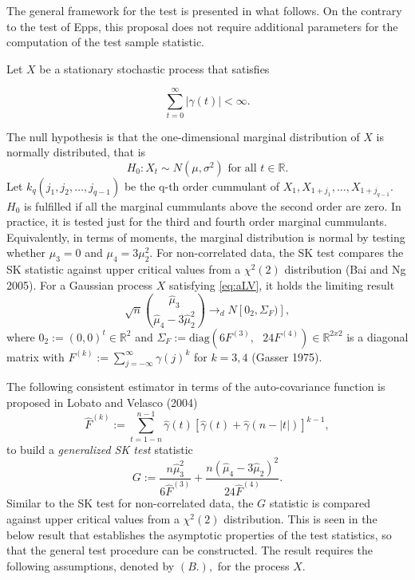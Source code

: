 The general framework for the test is presented in what follows. On the contrary to the test of Epps, this proposal does not require additional parameters for the computation of the test sample statistic.

Let \(X\) be a stationary stochastic process that satisfies

\begin{equation}
 \sum_{t=0}^{\infty}|\gamma(t)| <\infty. \label{eq:aLV}
\end{equation}

The null hypothesis is that the one-dimensional marginal distribution of \(X\) is normally distributed, that is
\[
H_0: X_t \sim N(\mu,\sigma^2) \text{ for all } t \in \mathbb{R}.
\]
Let \(k_q(j_1,j_2,\ldots,j_{q-1})\) be the q-th order cummulant of \(X_{1},X_{1+j_1},\ldots,X_{1+j_{q-1}}\). \(H_0\) is fulfilled if all the marginal cummulants above the second order are zero. In practice, it is tested just for the third and fourth order marginal cummulants. Equivalently, in terms of moments, the marginal distribution is normal by testing whether \(\mu_3 = 0\) and \(\mu_4 = 3 \mu_2^2\). For non-correlated data, the SK test compares the SK statistic against upper critical values from a \(\chi^2(2)\) distribution (Bai and Ng 2005). For a Gaussian process \(X\) satisfying \eqref{eq:aLV}, it holds the limiting result
\[
 \sqrt{n} \binom{\widehat{\mu}_3}{\widehat{\mu}_4 -3\widehat{\mu}^2_2} \to_d N[0_2,\Sigma_F)],
\]
where \(0_2 := (0,0)^t \in \mathbb{R}^2\) and \(\Sigma_F := \mbox{diag}(6F^{(3)}, \text{ } 24F^{(4)}) \in \mathbb{R}^{2x2}\) is a diagonal matrix with \(F^{(k)} := \sum_{j = -\infty}^{\infty}\gamma(j)^k\) for \(k=3,4\) (Gasser 1975).

The following consistent estimator in terms of the auto-covariance function is proposed in Lobato and Velasco (2004)
\[
 \widehat{F}^{(k)} := \sum_{t = 1-n}^{n-1}\widehat{\gamma}(t)[\widehat{\gamma}(t) +\widehat{\gamma}(n-|t|)]^{k-1},
\]
to build a \emph{generalized SK test} statistic
\[
 G := \dfrac{n \widehat{\mu}_3^2}{6 \widehat{F}^{(3)}} + \dfrac{n(\widehat{\mu}_4 -3\widehat{\mu}_2)^2}{24\widehat{F}^{(4)}}.
\]
Similar to the SK test for non-correlated data, the \(G\) statistic is compared against upper critical values from a \(\chi^2(2)\) distribution. This is seen in the below result that establishes the asymptotic properties of the test statistics, so that the general test procedure can be constructed. The result requires the following assumptions, denoted by \((B.),\) for the process \(X.\)

